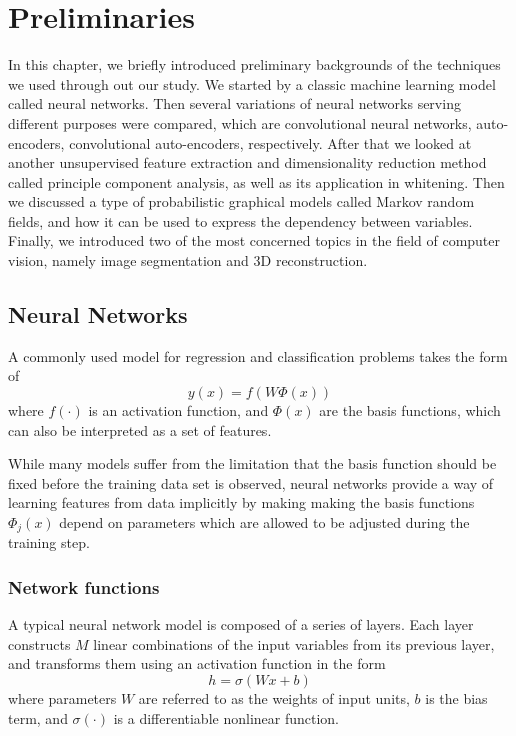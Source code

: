 
\chapter{Preliminaries}
\label{cha:Preliminaries}

In this chapter, we briefly introduced preliminary backgrounds of the techniques we used through out our study. We started by a classic machine learning model called neural networks. Then several variations of neural networks serving different purposes were compared, which are convolutional neural networks, auto-encoders, convolutional auto-encoders, respectively. After that we looked at another unsupervised feature extraction and dimensionality reduction method called principle component analysis, as well as its application in whitening. Then we discussed a type of probabilistic graphical models called Markov random fields, and how it can be used to express the dependency between variables. Finally, we introduced two of the most concerned topics in the field of computer vision, namely image segmentation and 3D reconstruction.

\section{Neural Networks}
\label{sec:Neural Networks}
A commonly used model for regression and classification problems takes the form of
\begin{equation}
	y(x) = f(W \Phi (x))
\end{equation}
where $f(\cdot)$ is an activation function, and $\Phi(x)$ are the basis functions, which can also be interpreted as a set of features. 

While many models suffer from the limitation that the basis function should be fixed before the training data set is observed, neural networks provide a way of learning features from data implicitly by making making the basis functions $\Phi_j(x)$ depend on parameters which are allowed to be adjusted during the training step.
\subsection{Network functions}
\label{sec:NN functions}

A typical neural network model is composed of a series of layers. Each layer constructs $M$ linear combinations of the input variables from its previous layer, and transforms them using an activation function in the form
\begin{equation}
	h = \sigma(Wx+b) 
\end{equation}
where parameters $W$ are referred to as the weights of input units, $b$ is the bias term, and $\sigma(\cdot)$ is a differentiable nonlinear function. 

